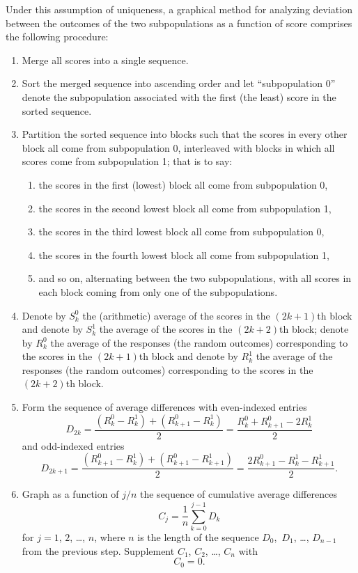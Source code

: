 \documentclass{article}
\begin{document}
Under this assumption of uniqueness, a graphical method for analyzing
deviation between the outcomes of the two subpopulations as a function
of score comprises the following procedure:
%
\begin{enumerate}
%
\item Merge all scores into a single sequence.
%
\item Sort the merged sequence into ascending order and
let ``subpopulation 0'' denote the subpopulation associated
with the first (the least) score in the sorted sequence.
%
\item Partition the sorted sequence into blocks such that
the scores in every other block all come from subpopulation 0,
interleaved with blocks in which all scores come from subpopulation 1;
that is to say:
%
\begin{enumerate}
\item the scores in the first (lowest) block all come from subpopulation 0,
\item the scores in the second lowest block all come from subpopulation 1,
\item the scores in the third lowest block all come from subpopulation 0,
\item the scores in the fourth lowest block all come from subpopulation 1,
\item and so on, alternating between the two subpopulations,
with all scores in each block coming from only one of the subpopulations.
\end{enumerate}
%
\item\label{defining} Denote by $S^0_k$ the (arithmetic) average of the scores
in the $(2k+1)$th block
and denote by $S^1_k$ the average of the scores in the $(2k+2)$th block;
denote by $R^0_k$ the average of the responses (the random outcomes)
corresponding to the scores in the $(2k+1)$th block and denote by $R^1_k$
the average of the responses (the random outcomes) corresponding to the scores
in the $(2k+2)$th block.
%
\item Form the sequence of average differences with even-indexed entries
%
\begin{equation}
\label{diff_even}
D_{2k} = \frac{(R^0_k - R^1_k) + (R^0_{k+1} - R^1_k)}{2}
       = \frac{R^0_k + R^0_{k+1} - 2R^1_k}{2}
\end{equation}
%
and odd-indexed entries
%
\begin{equation}
\label{diff_odd}
D_{2k+1} = \frac{(R^0_{k+1} - R^1_k) + (R^0_{k+1} - R^1_{k+1})}{2}
         = \frac{2R^0_{k+1} - R^1_k - R^1_{k+1}}{2}.
\end{equation}
%
\item Graph as a function of $j/n$ the sequence
of cumulative average differences
%
\begin{equation}
\label{cumulative}
C_j = \frac{1}{n} \sum_{k=0}^{j-1} D_k
\end{equation}
%
for $j = 1$, $2$, \dots, $n$,
where $n$ is the length of the sequence $D_0$,~$D_1$, \dots, $D_{n-1}$
from the previous step. Supplement $C_1$, $C_2$, \dots, $C_n$ with
%
\begin{equation}
\label{cumulative0}
C_0 = 0.
\end{equation}
%
\end{enumerate}
\end{document}
